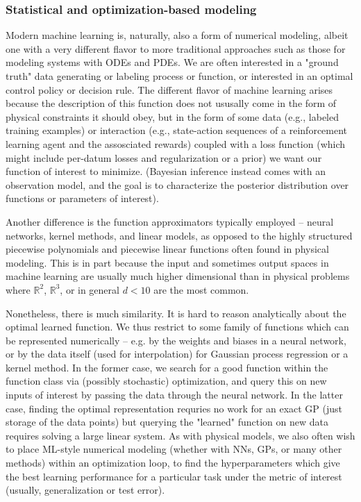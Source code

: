 \documentclass{puthesis}
\begin{document}
\subsubsection{Statistical and optimization-based modeling}
Modern machine learning is, naturally, also a form of numerical modeling,
albeit one with a very different flavor to more traditional approaches such as those
for modeling systems with ODEs and PDEs.
We are often interested in a "ground truth" data generating or labeling process or
function, or interested in an optimal control policy or decision rule.
The different flavor of machine learning arises because the description of this function
does not ususally come in the form of physical constraints it should obey,
but in the form of some data (e.g., labeled training examples) or interaction
(e.g., state-action sequences of a reinforcement learning agent and the assosciated
rewards) coupled with a loss function (which might include per-datum losses and
regularization or a prior) we want our function of interest to minimize.
(Bayesian inference instead comes with an observation model, and the goal is to
characterize the posterior distribution over functions or parameters of interest).

Another difference is the function approximators typically employed --
neural networks, kernel methods, and linear models, as opposed to the highly structured
piecewise polynomials and piecewise linear functions often found in physical modeling.
This is in part because the input and sometimes output spaces in machine learning are
usually much higher dimensional than in physical problems where $\mathbb{R}^2$,
$\mathbb{R}^3$, or in general $d < 10$ are the most common.

Nonetheless, there is much similarity. It is hard to reason analytically about the
optimal learned function.
We thus restrict to some family of functions which can be
represented numerically -- e.g. by the weights and biases in a neural network, or
by the data itself (used for interpolation) for Gaussian process regression or a
kernel method.
In the former case, we search for a good function within the function class via
(possibly stochastic) optimization, and query this on new inputs of interest
by passing the data through the neural network.
In the latter case, finding the optimal representation requries no work for an exact GP
(just storage of the data points) but querying the
"learned" function on new data requires solving a large linear system. As with physical models,
we also often wish to place ML-style numerical modeling (whether with NNs, GPs, or
many other methods) within an optimization loop, to find the hyperparameters which give
the best learning performance for a particular task under the metric of interest
(usually, generalization or test error).
\end{document}
